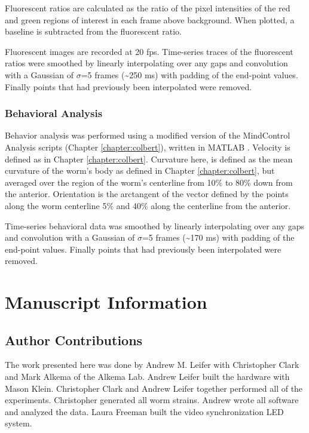Fluorescent ratios are calculated as the ratio of the pixel intensities of the red and green regions of interest in each frame above background. When plotted, a baseline is subtracted from the fluorescent ratio.
 
Fluorescent images are recorded at 20 fps. Time-series traces of the fluorescent ratios were smoothed by linearly interpolating over any gaps and convolution with a Gaussian of $\sigma$=5 frames (\textasciitilde 250 ms) with padding of the end-point values. Finally points that had previously been interpolated were removed.


\subsubsection{Behavioral Analysis}
Behavior analysis was performed using a modified version of the MindControl Analysis scripts (Chapter \ref{chapter:colbert}), written in MATLAB \citep{matlab_version_2010}. Velocity is defined as in Chapter \ref{chapter:colbert}. Curvature here, is defined as the mean curvature of the worm's body as defined in Chapter \ref{chapter:colbert}, but averaged over the region of the worm's centerline from 10\%  to 80\% down from the anterior. Orientation is the arctangent of the vector defined by the points along the worm centerline 5\% and 40\% along the centerline from the anterior.


Time-series behavioral data was smoothed by linearly interpolating over any gaps and convolution with a Gaussian of $\sigma$=5 frames (\textasciitilde 170 ms) with padding of the end-point values. Finally points that had previously been interpolated were removed.



\section{Manuscript Information}
\subsection{Author Contributions}
The work presented here was done by Andrew M. Leifer with Christopher Clark and Mark Alkema of the Alkema Lab. Andrew Leifer built the hardware with Mason Klein. Christopher Clark and Andrew Leifer together performed all of the experiments. Christopher generated all worm strains. Andrew wrote all software and analyzed the data. Laura Freeman built the video synchronization LED system. 

